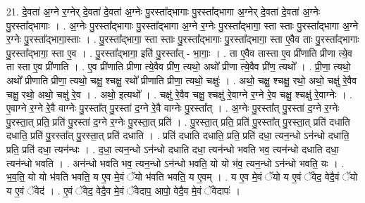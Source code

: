 \documentclass[17pt]{extarticle}
\begin{document}
21. दे॒वता॑ अ॒ग्ने र॒ग्नेर् दे॒वता॑ दे॒वता॑ अ॒ग्नेः पु॒रस्ता᳚द्भागाः पु॒रस्ता᳚द्भागा अ॒ग्नेर् दे॒वता॑ दे॒वता॑ अ॒ग्नेः पु॒रस्ता᳚द्भागाः । . अ॒ग्नेः पु॒रस्ता᳚द्भागाः पु॒रस्ता᳚द्भागा अ॒ग्ने र॒ग्नेः पु॒रस्ता᳚द्भागा॒ स्ता स्ताः पु॒रस्ता᳚द्भागा अ॒ग्ने र॒ग्नेः पु॒रस्ता᳚द्भागा॒स्ताः । . पु॒रस्ता᳚द्भागा॒ स्ता स्ताः पु॒रस्ता᳚द्भागाः पु॒रस्ता᳚द्भागा॒ स्ता ए॒वैव ताः पु॒रस्ता᳚द्भागाः पु॒रस्ता᳚द्भागा॒ स्ता ए॒व । . पु॒रस्ता᳚द्भागा॒ इति॑ पु॒रस्ता᳚त् - भा॒गाः॒ । . ता ए॒वैव तास्ता ए॒व प्री॑णाति प्रीणा त्ये॒व ता स्ता ए॒व प्री॑णाति । . ए॒व प्री॑णाति प्रीणा त्ये॒वैव प्री॑ण॒ त्यथो॒ अथो᳚ प्रीणा त्ये॒वैव प्री॑ण॒ त्यथो᳚ । . प्री॒णा॒ त्यथो॒ अथो᳚ प्रीणाति प्रीणा॒ त्यथो॒ चक्षु॒ श्चक्षु॒ रथो᳚ प्रीणाति प्रीणा॒ त्यथो॒ चक्षुः॑ । . अथो॒ चक्षु॒ श्चक्षु॒ रथो॒ अथो॒ चक्षु॑ रे॒वैव चक्षु॒ रथो॒ अथो॒ चक्षु॑ रे॒व । . अथो॒ इत्यथो᳚ । . चक्षु॑ रे॒वैव चक्षु॒ श्चक्षु॑ रे॒वाग्ने र॒ग्ने रे॒व चक्षु॒ श्चक्षु॑ रे॒वाग्नेः । . ए॒वाग्ने र॒ग्ने रे॒वै वाग्नेः पु॒रस्ता᳚त् पु॒रस्ता॑ द॒ग्ने रे॒वै वाग्नेः पु॒रस्ता᳚त् । . अ॒ग्नेः पु॒रस्ता᳚त् पु॒रस्ता॑ द॒ग्ने र॒ग्नेः पु॒रस्ता॒त् प्रति॒ प्रति॑ पु॒रस्ता॑ द॒ग्ने र॒ग्नेः पु॒रस्ता॒त् प्रति॑ । . पु॒रस्ता॒त् प्रति॒ प्रति॑ पु॒रस्ता᳚त् पु॒रस्ता॒त् प्रति॑ दधाति दधाति॒ प्रति॑ पु॒रस्ता᳚त् पु॒रस्ता॒त् प्रति॑ दधाति । . प्रति॑ दधाति दधाति॒ प्रति॒ प्रति॑ दधा॒ त्यन॒न्धो ऽन॑न्धो दधाति॒ प्रति॒ प्रति॑ दधा॒ त्यन॑न्धः । . द॒धा॒ त्यन॒न्धो ऽन॑न्धो दधाति दधा॒ त्यन॑न्धो भवति भव॒ त्यन॑न्धो दधाति दधा॒ त्यन॑न्धो भवति । . अन॑न्धो भवति भव॒ त्यन॒न्धो ऽन॑न्धो भवति॒ यो यो भ॑व॒ त्यन॒न्धो ऽन॑न्धो भवति॒ यः । . भ॒व॒ति॒ यो यो भ॑वति भवति॒ य ए॒व मे॒वं ॅयो भ॑वति भवति॒ य ए॒वम् । . य ए॒व मे॒वं ॅयो य ए॒वं ॅवेद॒ वेदै॒वं ॅयो य ए॒वं ॅवेद॑ । . ए॒वं ॅवेद॒ वेदै॒व मे॒वं ॅवेदाप॒ आपो॒ वेदै॒व मे॒वं ॅवेदापः॑ । \newline
\end{document}

